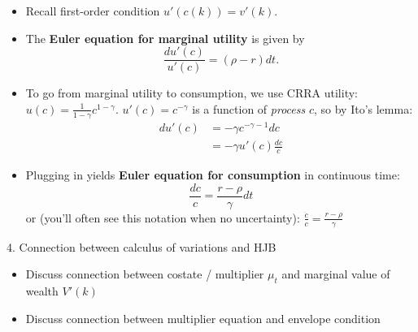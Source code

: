 \documentclass[10pt]{beamer}
\begin{document}
\begin{frame}{}
\begin{itemize}
\item Recall first-order condition $u'(c(k)) = v'(k)$.

\item The \textbf{Euler equation for marginal utility }is given by
\begin{equation*}
	\frac{d u'(c)}{u'(c)} = (\rho - r) dt.
\end{equation*}

\item To go from marginal utility to consumption, we use CRRA utility: $u(c) = \frac{1}{1-\gamma} c^{1-\gamma}$. $u'(c) = c^{-\gamma}$ is a function of \textit{process} $c$, so by Ito's lemma: 
\begin{align*}
	d u'(c) &= -\gamma c^{-\gamma - 1} dc \\
	&= -\gamma u'(c) \frac{dc}{c} 
\end{align*}

\item Plugging in yields \textbf{Euler equation for consumption} in continuous time:
\begin{equation*}
	\frac{dc}{c} = \frac{r - \rho}{\gamma} dt
\end{equation*}
or (you'll often see this notation when no uncertainty): $\frac{\dot c}{c} = \frac{r - \rho}{\gamma}$
\end{itemize}
\end{frame}



\begin{frame}{4. Connection between calculus of variations and HJB}
\begin{itemize}
\item Discuss connection between costate / multiplier $\mu_t$ and marginal value of wealth $V'(k)$

\item Discuss connection between multiplier equation and envelope condition
\end{itemize}
\end{frame}
\end{document}
